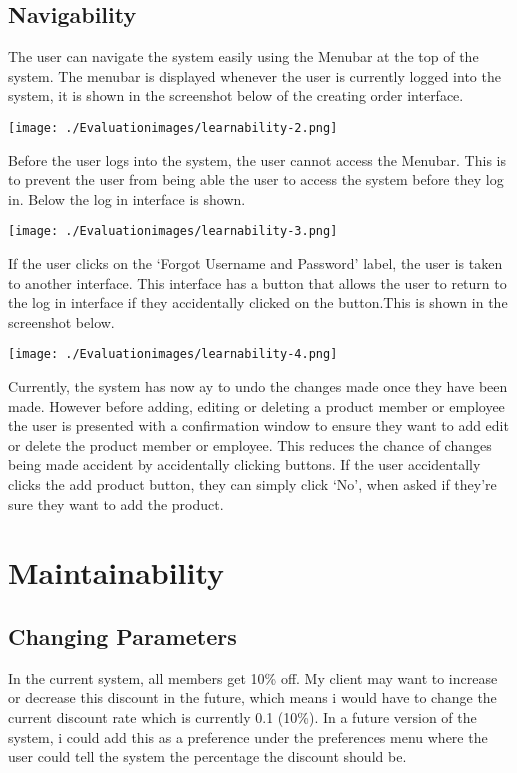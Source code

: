 \subsection{Navigability} 

The user can navigate the system easily using the Menubar at the top of the system. The menubar is displayed whenever the user is currently logged into the system, it is shown in the screenshot below of the creating order interface.

\texttt{[image: ./Evaluationimages/learnability-2.png]}

Before the user logs into the system, the user cannot access the Menubar. This is to prevent the user from being able the user to access the system before they log in. Below the log in interface is shown.

\texttt{[image: ./Evaluationimages/learnability-3.png]}

If the user clicks on the `Forgot Username and Password' label, the user is taken to another interface. This interface has a button that allows the user to return to the log in interface if they accidentally clicked on the button.This is shown in the screenshot below.

\texttt{[image: ./Evaluationimages/learnability-4.png]}

Currently, the system has now ay to undo the changes made once they have been made. However before adding, editing or deleting a product member or employee the user is presented with a confirmation window to ensure they want to add edit or delete the product member or employee. This reduces the chance of changes being made accident by accidentally clicking buttons. If the user accidentally clicks the add product button, they can simply click `No', when asked if they're sure they want to add the product.

\pagebreak
\section{Maintainability}

\subsection{Changing Parameters}

In the current system, all members get 10\% off. My client may want to increase or decrease this discount in the future, which means i would have to change the current discount rate which is currently 0.1 (10\%). In a future version of the system, i could add this as a preference under the preferences menu where the user could tell the system the percentage the discount should be.

